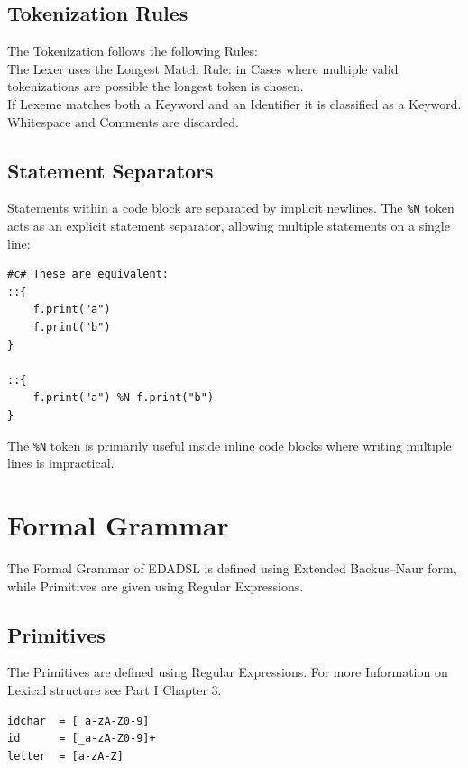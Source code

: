 \documentclass{report}
\begin{document}
\section{Tokenization Rules}
The Tokenization follows the following Rules: \\
The Lexer uses the Longest Match Rule: in Cases where multiple valid tokenizations are possible the longest token is chosen. \\
If Lexeme matches both a Keyword and an Identifier it is classified as a Keyword. \\
Whitespace and Comments are discarded.

\section{Statement Separators}
Statements within a code block are separated by implicit newlines. The \texttt{\%N} token acts as an explicit statement separator, allowing multiple statements on a single line:
\begin{verbatim}
#c# These are equivalent:
::{
    f.print("a")
    f.print("b")
}

::{
    f.print("a") %N f.print("b")
}
\end{verbatim}
The \texttt{\%N} token is primarily useful inside inline code blocks where writing multiple lines is impractical.

\chapter{Formal Grammar}
The Formal Grammar of EDADSL is defined using Extended Backus–Naur form, while Primitives are given using Regular Expressions.
\section{Primitives}
The Primitives are defined using Regular Expressions. For more Information on Lexical structure see Part I Chapter 3.
\begin{verbatim}
idchar  = [_a-zA-Z0-9]
id      = [_a-zA-Z0-9]+
letter  = [a-zA-Z]
\end{verbatim}
\end{document}
